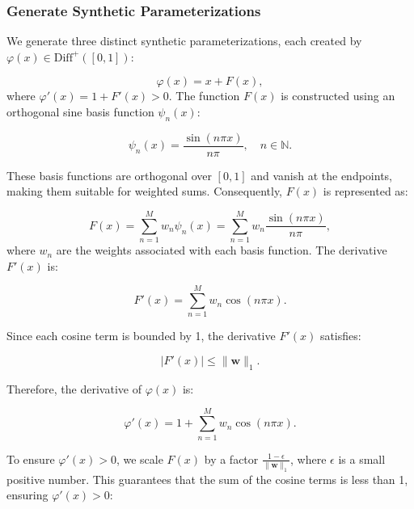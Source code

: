 \FloatBarrier
\subsubsection{Generate Synthetic Parameterizations}
\label{subsubsec:generate-synthetic-parameterizations}

We generate three distinct synthetic parameterizations, each created by \(\varphi(x) \in \mathrm{Diff}^+([0,1])\):

\begin{equation}
    \varphi(x) = x + F(x),
\end{equation}
where \(\varphi'(x) = 1 + F'(x) > 0\). The function \(F(x)\) is constructed using an orthogonal sine basis function \(\psi_n(x)\):

\begin{equation}
    \psi_n(x) = \frac{\sin(n \pi x)}{n \pi}, \quad n \in \mathbb{N}.
\end{equation}

These basis functions are orthogonal over \([0, 1]\) and vanish at the endpoints, making them suitable for weighted sums. Consequently, \(F(x)\) is represented as:

\begin{equation}
    F(x) = \sum_{n=1}^{M} w_n \psi_n(x) = \sum_{n=1}^{M} w_n \frac{\sin(n \pi x)}{n \pi},
\end{equation}
where \(w_n\) are the weights associated with each basis function. The derivative \(F'(x)\) is:

\begin{equation}
    F'(x) = \sum_{n=1}^{M} w_n \cos(n \pi x).
\end{equation}

Since each cosine term is bounded by 1, the derivative \(F'(x)\) satisfies:

\begin{equation}
    |F'(x)| \leq \|\mathbf{w}\|_1.
\end{equation}

Therefore, the derivative of \(\varphi(x)\) is:

\begin{equation}
    \varphi'(x) = 1 + \sum_{n=1}^{M} w_n \cos(n \pi x).
\end{equation}

To ensure \(\varphi'(x) > 0\), we scale \(F(x)\) by a factor \(\frac{1 - \epsilon}{\|\mathbf{w}\|_1}\), where \(\epsilon\) is a small positive number. This guarantees that the sum of the cosine terms is less than 1, ensuring \(\varphi'(x) > 0\):

